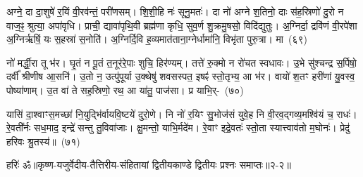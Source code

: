 अग्ने॒ दा दा॒शुषे॑ र॒यिं वी॒रव॑न्तं॒ परी॑णसम्। शि॒शी॒हि नः॑ सूनु॒मतः॑। दा नो॑ अग्ने श॒तिनो॒ दाः स॑ह॒स्रिणो॑ दु॒रो न वाज॒ꣴ॒ श्रुत्या॒ अपा॑वृधि। प्राची॒ द्यावा॑\-पृथि॒वी ब्रह्म॑णा कृधि॒ सुव॒र्ण शु॒क्रमु॒षसो॒ विदि॑द्युतुः। अ॒ग्निर्दा॒ द्रवि॑णं वी॒रपे॑शा अ॒ग्निर्\mbox{}ऋषिं॒ यः स॒हस्रा॑ स॒नोति॑। अ॒ग्निर्दि॒वि ह॒व्यमात॑ताना॒ग्नेर्धामा॑नि॒ विभृ॑ता पुरु॒त्रा। मा~(६९)\ip

नो॑ मर्द्धी॒रा तू भ॑र। घृ॒तं न पू॒तं त॒नूर॑रे॒पाः शुचि॒ हिर॑ण्यम्। तत्ते॑ रु॒क्मो न रो॑चत स्वधावः। उ॒भे सु॑श्चन्द्र स॒र्पिषो॒ दर्वी᳚ श्रीणीष आ॒सनि॑। उ॒तो न॒ उत्पु॑पूर्या उ॒क्थेषु॑ शवसस्पत॒ इषꣴ॑ स्तो॒तृभ्य॒ आ भ॑र। वायो॑ श॒तꣳ हरी॑णां यु॒वस्व॒ पोष्या॑णाम्। उ॒त वा॑ ते सह॒स्रिणो॒ रथ॒ आ या॑तु॒ पाज॑सा। प्र याभि॒र्-~(७०)\ip

यासि॑ दा॒श्वाꣳस॒मच्छा॑ नि॒युद्भि॑र्वायवि॒ष्टये॑ दुरो॒णे। नि नो॑ र॒यिꣳ सु॒भोज॑सं युवे॒ह नि वी॒रव॒द्गव्य॒मश्वि॑यं च॒ राधः॑। रे॒वती᳚र्नः सध॒माद॒ इन्द्रे॑ सन्तु तु॒विवा॑जाः। क्षु॒मन्तो॒ याभि॒र्मदे॑म। रे॒वाꣳ इद्रे॒वतः॑ स्तो॒ता स्यात्त्वाव॑तो म॒घोनः॑। प्रेदु॑ हरिवः श्रु॒तस्य॑॥~(७१)\ip

{\anuvakamend[जि॒नोषि॑ देभुः॒ प्र ह॒व्यं ब॒भूथ॒ मा याभि॑श्चत्वारि॒ꣳ॒शच्च॑]}

{हरिः॑ ॐ}{॥कृष्ण-यजुर्वेदीय-तैत्तिरीय-संहितायां द्वितीयकाण्डे द्वितीयः प्रश्नः समाप्तः॥२-२॥}


